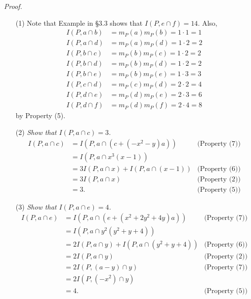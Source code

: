 \documentclass{article}
\begin{document}
\emph{Proof.}
\begin{enumerate}
\item[(1)]
  Note that Example in \S 3.3 shows that $I(P, e \cap f) = 14$.
  Also,
  \begin{align*}
    I(P, a \cap b) &= m_P(a) m_P(b) = 1 \cdot 1 = 1 \\
    I(P, a \cap d) &= m_P(a) m_P(d) = 1 \cdot 2 = 2 \\
    I(P, b \cap c) &= m_P(b) m_P(c) = 1 \cdot 2 = 2 \\
    I(P, b \cap d) &= m_P(b) m_P(d) = 1 \cdot 2 = 2 \\
    I(P, b \cap e) &= m_P(b) m_P(e) = 1 \cdot 3 = 3 \\
    I(P, c \cap d) &= m_P(c) m_P(d) = 2 \cdot 2 = 4 \\
    I(P, d \cap e) &= m_P(d) m_P(e) = 2 \cdot 3 = 6 \\
    I(P, d \cap f) &= m_P(d) m_P(f) = 2 \cdot 4 = 8
  \end{align*}
  by Property (5).

\item[(2)]
  \emph{Show that $I(P, a \cap c) = 3$.}
  \begin{align*}
    I(P, a \cap c)
    &= I(P, a \cap (c + (-x^2-y)a))
      & \text{(Property (7))} \\
    &= I(P, a \cap x^3(x - 1)) \\
    &= 3I(P, a \cap x) + I(P, a \cap (x - 1))
      & \text{(Property (6))} \\
    &= 3I(P, a \cap x)
      & \text{(Property (2))} \\
    &= 3.
      & \text{(Property (5))}
  \end{align*}

\item[(3)]
  \emph{Show that $I(P, a \cap e) = 4$.}
  \begin{align*}
    I(P, a \cap e)
    &= I(P, a \cap (e + (x^2+2y^2+4y)a))
      & \text{(Property (7))} \\
    &= I(P, a \cap y^2(y^2+y+4)) \\
    &= 2I(P, a \cap y) + I(P, a \cap (y^2+y+4))
      & \text{(Property (6))} \\
    &= 2I(P, a \cap y)
      & \text{(Property (2))} \\
    &= 2I(P, (a-y) \cap y)
      & \text{(Property (7))} \\
    &= 2I(P, (-x^2) \cap y) \\
    &= 4.
      & \text{(Property (5))}
  \end{align*}


\end{enumerate}
\end{document}
